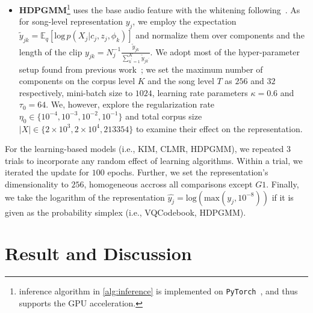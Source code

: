 \documentclass{article}
\begin{document}
\begin{itemize}[noitemsep, leftmargin=*]
    \item \textbf{HDPGMM}\footnote{inference algorithm in \cref{alg:inference} is implemented on \texttt{PyTorch}~\cite{NEURIPS2019_9015}, and thus supports the GPU acceleration.} uses the base audio feature with the whitening following~\cite{DBLP:conf/ismir/NamHSS12}. As for song-level representation $y_{j}$, we employ the expectation $\tilde{y}_{jk} = \mathbb{E}_{q}[\text{log}\,p(X_{j}|c_{j}, z_{j}, \phi_{k})]$ and normalize them over components and the length of the clip $y_{jk} = N_{j}^{-1}\frac{\tilde{y}_{jk}}{\sum_{k^{\prime}=1}^{K}\tilde{y}_{jk^{\prime}}}$. We adopt most of the hyper-parameter setup found from previous work~\cite{DBLP:journals/jmlr/WangPB11}; we set the maximum number of components on the corpus level $K$ and the song level $T$ as $256$ and $32$ respectively, mini-batch size to $1024$, learning rate parameters $\kappa=0.6$ and $\tau_{0}=64$. We, however, explore the regularization rate $\eta_{0} \in \{10^{-4}, 10^{-3}, 10^{-2}, 10^{-1}\}$ and total corpus size $|X| \in \{2\times10^{3}, 2\times10^{4}, 213354\}$ to examine their effect on the representation.
\end{itemize}

For the learning-based models (i.e., KIM, CLMR, HDPGMM), we repeated $3$ trials to incorporate any random effect of learning algorithms. Within a trial, we iterated the update for $100$ epochs. Further, we set the representation's dimensionality to $256$, homogeneous accross all comparisons except $G1$. Finally, we take the logarithm of the representation $\hat{y_{j}} = \text{log}(\text{max}(y_{j}, 10^{-8}))$ if it is given as the probability simplex (i.e., VQCodebook, HDPGMM).


\section{Result and Discussion}\label{sec:result_discussion}
\end{document}
